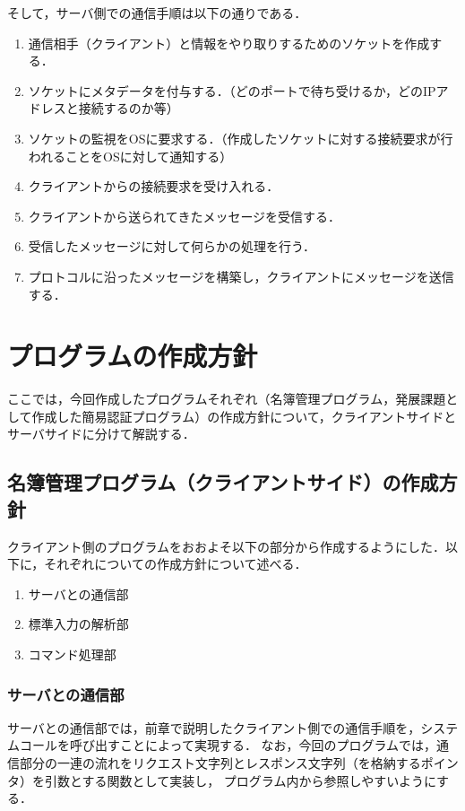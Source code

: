 \documentclass[11pt]{jsarticle}
\begin{document}
そして，サーバ側での通信手順は以下の通りである．

\begin{enumerate}
      \item 通信相手（クライアント）と情報をやり取りするためのソケットを作成する．
      \item ソケットにメタデータを付与する．（どのポートで待ち受けるか，どのIPアドレスと接続するのか等）
      \item ソケットの監視をOSに要求する．（作成したソケットに対する接続要求が行われることをOSに対して通知する）
      \item クライアントからの接続要求を受け入れる．
      \item クライアントから送られてきたメッセージを受信する．
      \item 受信したメッセージに対して何らかの処理を行う．
      \item プロトコルに沿ったメッセージを構築し，クライアントにメッセージを送信する．
\end{enumerate}

\section{プログラムの作成方針}

ここでは，今回作成したプログラムそれぞれ（名簿管理プログラム，発展課題として作成した簡易認証プログラム）の作成方針について，クライアントサイドとサーバサイドに分けて解説する．

\subsection{名簿管理プログラム（クライアントサイド）の作成方針}

クライアント側のプログラムをおおよそ以下の部分から作成するようにした．以下に，それぞれについての作成方針について述べる．

\begin{enumerate}
      \item サーバとの通信部
      \item 標準入力の解析部
      \item コマンド処理部
\end{enumerate}

\subsubsection{サーバとの通信部}
サーバとの通信部では，前章で説明したクライアント側での通信手順を，システムコールを呼び出すことによって実現する．
なお，今回のプログラムでは，通信部分の一連の流れをリクエスト文字列とレスポンス文字列（を格納するポインタ）を引数とする関数として実装し，
プログラム内から参照しやすいようにする．
\end{document}
